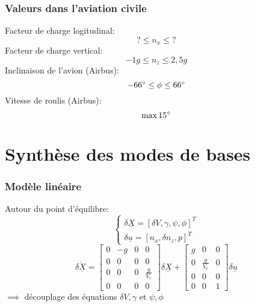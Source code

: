 \documentclass[tikz, footheight=2em]{beamer}
\begin{document}

\begin{frame}
    \frametitle{Valeurs dans l'aviation civile}\pause{}
    Facteur de charge logitudinal:
    \[
    ? \le n_x \le ?
    \]\pause{}
    Facteur de charge vertical:
    \[
    -1g \le n_z \le 2,5g
    \]\pause{}
    Inclinaison de l'avion (Airbus):
    \[
    -66\degree \le \phi \le 66\degree
    \] \pause{}
    Vitesse de roulis (Airbus):
    \[
    \max 15\degree
    \]
\end{frame}


\section{Synthèse des modes de bases}


\begin{frame}
    \frametitle{Modèle linéaire} \pause{}
    Autour du point d'équilibre:
    \[
    \left \{
    \begin{array}{c}
        \delta{} \underline{X} = {[\delta V, \gamma, \psi, \phi]}^{T} \\
        \delta{} \underline{u} = {[n_x, \delta n_z, p]}^{T}
    \end{array}
    \right.
    \]
    \[
    \delta \dot{\underline{X}}
    =
    \left[
    \begin{array}{cccc}
        0 & -g & 0 & 0 \\
        0 & 0 & 0 & 0 \\
        0 & 0 & 0 & \frac{g}{V_e} \\
        0 & 0 & 0 & 0
    \end{array}
    \right]
    \delta{} \underline{X}
    +
    \left[
    \begin{array}{cccc}
        g & 0 & 0 \\
        0 & \frac{g}{V_e} & 0 \\
        0 & 0 & 0 \\
        0 & 0 & 1
    \end{array}
    \right]
    \delta{} \underline{u}
    \] \pause{}
    \( \implies \) découplage des équations \( \delta V, \gamma \) et \( \psi, \phi \)
\end{frame}
\end{document}
